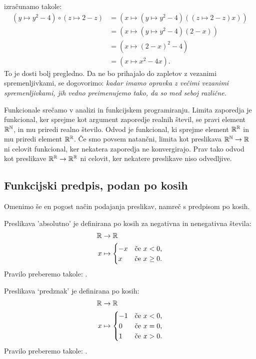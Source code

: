 %
izračunamo takole:
%
\begin{align*}
  (y \mapsto y^2  - 4) \circ (z \mapsto 2 - z)
  &= (x \mapsto (y \mapsto y^2 - 4) ((z \mapsto 2 - z) x)) \\
  &= (x \mapsto (y \mapsto y^2 - 4) (2 - x)) \\
  &= (x \mapsto (2 - x)^2 - 4) \\
  &= (x \mapsto x^2 - 4 x).
\end{align*}
%
To je dosti bolj pregledno. Da ne bo prihajalo do zapletov z vezanimi spremenljivkami, se
dogovorimo: \emph{kadar imamo opravka z večimi vezanimi spremenljivkami, jih vedno
  preimenujemo tako, da so med seboj različne.}

Funkcionale srečamo v analizi in funkcijskem programiranju. Limita zaporedja je
funkcional, ker sprejme kot argument zaporedje realnih števil, se pravi element $\mathbb{R}^{\mathbb{N}}$,
in mu priredi realno število. Odvod je funkcional, ki sprejme element $\mathbb{R}^{\mathbb{R}}$ in mu
priredi element $\mathbb{R}^{\mathbb{R}}$. Če smo povsem natančni, limita kot preslikava $\mathbb{R}^{\mathbb{N}} \to \mathbb{R}$
ni celovit funkcional, ker nekatera zaporedja ne konvergirajo. Prav tako odvod kot
preslikave $\mathbb{R}^{\mathbb{R}} \to \mathbb{R}^{\mathbb{R}}$ ni celovit, ker nekatere preslikave niso odvedljive.

\subsection{Funkcijski predpis, podan po kosih}

Omenimo še en pogost način podajanja preslikav, namreč s predpisom po kosih.

\begin{zgled}
  Preslikava 'absolutno' je definirana po kosih za negativna in nenegativna števila:
  \begin{align*}
    \mathbb{R} &\to \mathbb{R} \\
    x &\mapsto
    \begin{cases}
      -x & \text{če $x < 0$,}\\
       x & \text{če $x \geq 0$.}
    \end{cases}
  \end{align*}
  Pravilo preberemo takole: .
\end{zgled}

\begin{zgled}
  Preslikava `predznak' je definirana po kosih:
  \begin{align*}
    \mathbb{R} &\to \mathbb{R} \\
    x &\mapsto
      \begin{cases}
        -1 & \text{če $x < 0$,}\\
        0 & \text{če $x = 0$,}\\
        1 & \text{če $x > 0$.}
      \end{cases}
  \end{align*}
  Pravilo preberemo takole: .
\end{zgled}

